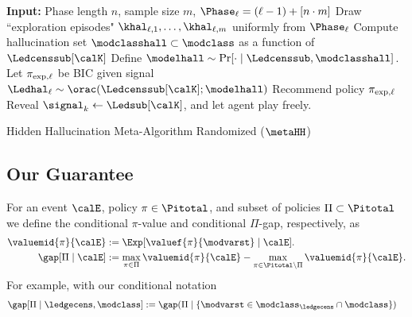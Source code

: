 	\begin{algorithm}[h]
  	\begin{algorithmic}[1]
  	\State{}\textbf{Input: } Phase length $n$, sample size $m$,
    \Statex{}
    \State{}$\Phase_{\ell} = (\ell - 1) + [n\cdot m]$
    \State{}Draw ``exploration episodes" $\khal_{\ell,1},\dots,\khal_{\ell,m}$ uniformly from $\Phase_{\ell}$
     \Statex{} 
    \State{}Compute hallucination set $\modclasshall \subset \modclass$ as a function of $ \Ledcenssub[\calK]$
    \Statex{}
     \State{}Define $\modelhall\sim \Pr[\cdot \mid \Ledcenssub, \modclasshall]$. 
    \State{}Let $\pi_{\mathrm{exp},\ell}$ be BIC given  signal $\Ledhal_{\ell} \sim \orac( \Ledcenssub[\calK]; \modelhall)$ 
    \Statex{}
    \State{}  Recommend policy $\pi_{\mathrm{exp},\ell}$
    \Else{} 
     \State{} Reveal $\signal_k \gets \Ledsub[\calK]$, and let agent play freely.
    \EndIf 
    \EndFor
    \EndFor 
  \end{algorithmic}
  \caption{Hidden Hallucination Meta-Algorithm Randomized ($\metaHH$)}
  \label{alg:meta_HH}
	\end{algorithm}





\subsection{Our Guarantee}

For an event $\calE$, policy $\pi \in \Pitotal$, and subset of policies $\Pi \subset \Pitotal$ we define the conditional $\pi$-value and conditional $\Pi$-gap, respectively, as
\begin{align}
\valuemid{\pi}{\calE} &:= \Exp[\valuef{\pi}{\modvarst} \mid \calE].\\
\gap[\Pi \mid \calE] &:= \max_{\pi \in \Pi} \valuemid{\pi}{\calE} -  \max_{\pi \in \Pitotal \setminus \Pi} \valuemid{\pi}{\calE}. 
\end{align}
For example, with our conditional notation
\begin{align}
    \gap[ \Pi \mid  \ledgecens , \modclass] &:= \gap(\Pi  \mid \{\modvarst \in \modclass_{\ledgecens} \cap \modclass\})
\end{align}

